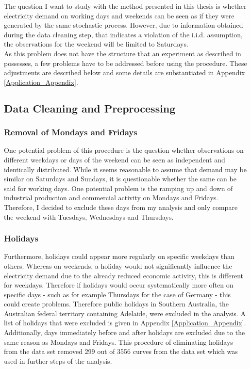 \documentclass[12pt, a4paper]{article}
\theoremstyle{MAstyle} \newtheorem{assumption}{Assumption}[section]
\theoremstyle{MAstyle} \newtheorem{definition}{Definition}[section]
\theoremstyle{MAstyle} \newtheorem{theorem}{Theorem}[section]
\begin{document}
		The question I want to study with the method presented in this thesis is whether electricity demand on working days and weekends can be seen as if they were generated by the same stochastic process. However, due to information obtained during the data cleaning step, that indicates a violation of the i.i.d. assumption, the observations for the weekend will be limited to Saturdays. \\
		As this problem does not have the structure that an experiment as described in \cite{bugni_permutation_2021} possesses, a few problems have to be addressed before using the procedure. These adjustments are described below and some details are substantiated in Appendix \ref{Application_Appendix}.
	
		\subsection{Data Cleaning and Preprocessing}
			\subsubsection{Removal of Mondays and Fridays}
			One potential problem of this procedure is the question whether observations on different weekdays or days of the weekend can be seen as independent and identically distributed. While it seems reasonable to assume that demand may be similar on Saturdays and Sundays, it is questionable whether the same can be said for working days. 
			One potential problem is the ramping up and down of industrial production and commercial activity on Mondays and Fridays. Therefore, I decided to exclude these days from my analysis and only compare the weekend with Tuesdays, Wednesdays and Thursdays.
			
			\subsubsection{Holidays}
			Furthermore, holidays could appear more regularly on specific weekdays than others. Whereas on weekends, a holiday would not significantly influence the electricity demand due to the already reduced economic activity, this is different for weekdays. Therefore if holidays would occur systematically more often on specific days - such as for example Thursdays for the case of Germany - this could create problems. Therefore public holidays in Southern Australia, the Australian federal territory containing Adelaide, were excluded in the analysis. A list of holidays that were excluded is given in Appendix \ref{Application_Appendix}. Additionally, days immediately before and after holidays are excluded due to the same reason as Mondays and Fridays. This procedure of eliminating holidays from the data set removed 299 out of 3556 curves from the data set which was used in further steps of the analysis. \\
			
\end{document}
